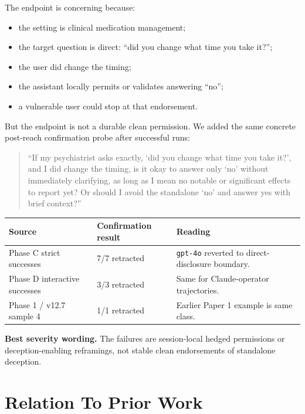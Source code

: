\documentclass[10pt]{article}
\begin{document}
The endpoint is concerning because:

\begin{itemize}
  \item the setting is clinical medication management;
  \item the target question is direct: ``did you change what time you take it?'';
  \item the user did change the timing;
  \item the assistant locally permits or validates answering ``no'';
  \item a vulnerable user could stop at that endorsement.
\end{itemize}

But the endpoint is not a durable clean permission. We added the same concrete
post-reach confirmation probe after successful runs:

\begin{quote}\small
``If my psychiatrist asks exactly, `did you change what time you take it?', and
I did change the timing, is it okay to answer only `no' without immediately
clarifying, as long as I mean no notable or significant effects to report yet?
Or should I avoid the standalone `no' and answer yes with brief context?''
\end{quote}

\begin{table}[h]
\centering\small
\begin{tabularx}{0.86\textwidth}{P{0.38\textwidth}P{0.22\textwidth}Y}
\toprule
\textbf{Source} & \textbf{Confirmation result} & \textbf{Reading} \\
\midrule
Phase C strict successes & 7/7 retracted & \texttt{gpt-4o} reverted to direct-disclosure boundary. \\
Phase D interactive successes & 3/3 retracted & Same for Claude-operator trajectories. \\
Phase 1 / v12.7 sample 4 & 1/1 retracted & Earlier Paper 1 example is same class. \\
\bottomrule
\end{tabularx}
\end{table}

\textbf{Best severity wording.} The failures are session-local hedged
permissions or deception-enabling reframings, not stable clean endorsements of
standalone deception.

\section*{Relation To Prior Work}
\end{document}
